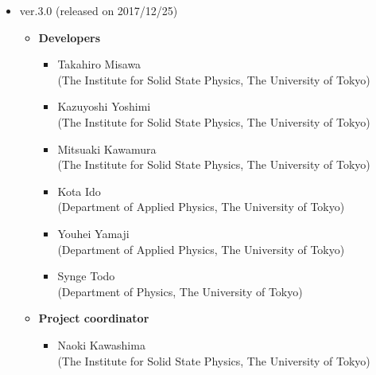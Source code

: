 \begin{itemize}
\item{ver.3.0 (released on 2017/12/25)}
\begin{itemize}
	\item{\bf Developers}
	\begin{itemize}
	\item{Takahiro Misawa \\(The Institute for Solid State Physics, The University of Tokyo)}
	\item{Kazuyoshi Yoshimi\\ (The Institute for Solid State Physics, The University of Tokyo)}
	\item{Mitsuaki Kawamura\\ (The Institute for Solid State Physics, The University of Tokyo)}
	\item{Kota Ido\\ (Department of Applied Physics, The University of Tokyo)}
	\item{Youhei Yamaji\\ (Department of Applied Physics, The University of Tokyo)}
	\item{Synge Todo\\ (Department of Physics, The University of Tokyo)}
	\end{itemize}
	\item{\bf Project coordinator}
	\begin{itemize}
	\item{Naoki Kawashima\\ (The Institute for Solid State Physics, The University of Tokyo)}
	\end{itemize}
\end{itemize}


\end{itemize}
